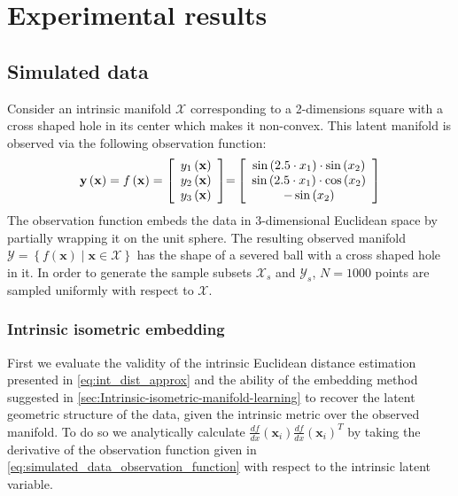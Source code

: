 
\section{Experimental results} \label{sec:results}

	\subsection{Simulated data}
	
	Consider an intrinsic manifold $\mathcal{X}$ corresponding to a 2-dimensions square with a cross shaped hole in its center which makes it non-convex. This latent manifold is observed via the following observation function:
	\begin{equation} \label{eq:simulated_data_observation_function}
	\mathbf{y\left(\mathbf{x}\right)}=f\left(\mathbf{x}\right)=\text{\ensuremath{\left[\begin{array}{c}
			y_{1}\left(\mathbf{x}\right)\\
			y_{2}\left(\mathbf{x}\right)\\
			y_{3}\left(\mathbf{x}\right) 
			\end{array}\right]}=}
		\left[\begin{array}{c}
	\sin \left(2.5 \cdot x_1 \right)\cdot \sin \left( x_2 \right)\\
	\sin \left(2.5 \cdot x_1 \right)\cdot \cos \left( x_2 \right)\\
	-\sin \left( x_2 \right)
	\end{array}\right]
	\end{equation}
	The observation function embeds the data in 3-dimensional Euclidean space by partially wrapping it on the unit sphere. The resulting observed manifold $\mathcal{Y}=\left\{ f\left(\mathbf{x}\right) \mid \mathbf{x}\in\mathcal{X}\right\}$ has the shape of a severed ball with a cross shaped hole in it. In order to generate the sample subsets $\mathcal{X}_{s}$ and $\mathcal{Y}_{s}$, $N=1000$ points are sampled uniformly with respect to $\mathcal{X}$. 
	
	\subsubsection{Intrinsic isometric embedding} \label{ssec:simulated_data_Intrinsic_isometric_embedding}
	First we evaluate the validity of the intrinsic Euclidean distance estimation presented in \cref{eq:int_dist_approx} and the ability of the embedding method suggested in \cref{sec:Intrinsic-isometric-manifold-learning} to recover the latent geometric structure of the data, given the intrinsic metric over the observed manifold. To do so we analytically calculate $\frac{df}{dx}\left(\mathbf{x}_{i}\right)\frac{df}{dx}\left(\mathbf{x}_{i}\right)^{T}$ by taking the derivative of the observation function given in \cref{eq:simulated_data_observation_function} with respect to the intrinsic latent variable. 
	
